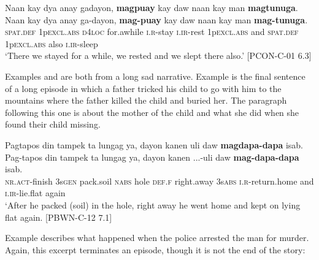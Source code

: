 \ea
\label{ex:weslepttherealso}
Naan kay dya anay gadayon, \textbf{magpuay} kay daw naan kay man \textbf{magtunuga}. \\
\vspace{4pt} \gll Naan kay dya anay ga-dayon, \textbf{mag-puay} kay daw naan kay man \textbf{mag-tunuga}. \\
\textsc{spat.def} 1p\textsc{excl.abs} \textsc{d4loc} for.awhile \textsc{i.r}-stay \textsc{i.ir}-rest 1p\textsc{excl.abs} and \textsc{spat.def} 1p\textsc{excl.abs} also \textsc{i.ir}-sleep \\
\glt ‘There we stayed for a while, we rested and we slept there also.’ [PCON-C-01 6.3]
\z

Examples  and  are both from a long sad narrative. Example  is the final sentence of a long episode in which a father tricked his child to go with him to the mountains where the father killed the child and buried her. The paragraph following this one is about the mother of the child and what she did when she found their child missing. 

\ea
Pagtapos din tampek ta lungag ya, dayon kanen uli daw \textbf{magdapa-dapa} isab. \\
\vspace{4pt} \gll Pag-tapos din tampek ta lungag ya, dayon kanen ...-uli daw \textbf{mag-dapa-dapa} isab. \\
\textsc{nr.act}-finish 3s\textsc{gen} pack.soil \textsc{nabs} hole \textsc{def.f} right.away 3s\textsc{abs} \textsc{i.r}-return.home and \textsc{i.ir}-lie.flat again\\
\glt ‘After he packed (soil) in the hole, right away he went home and kept on lying flat again. [PBWN-C-12 7.1]
\z

Example  describes what happened when the police arrested the man for murder. Again, this excerpt terminates an episode, though it is not the end of the story: 

